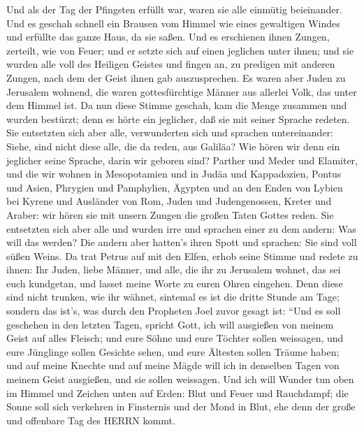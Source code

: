  Und als der Tag der Pfingsten erfüllt war, waren sie alle
einmütig beieinander.  Und es geschah schnell ein Brausen
vom Himmel wie eines gewaltigen Windes und erfüllte das ganze Haus, da
sie saßen.  Und es erschienen ihnen Zungen, zerteilt, wie
von Feuer; und er setzte sich auf einen jeglichen unter ihnen;
 und sie wurden alle voll des Heiligen Geistes und fingen
an, zu predigen mit anderen Zungen, nach dem der Geist ihnen gab
auszusprechen.  Es waren aber Juden zu Jerusalem wohnend,
die waren gottesfürchtige Männer aus allerlei Volk, das unter dem Himmel
ist.  Da nun diese Stimme geschah, kam die Menge zusammen
und wurden bestürzt; denn es hörte ein jeglicher, daß sie mit seiner
Sprache redeten.  Sie entsetzten sich aber alle,
verwunderten sich und sprachen untereinander: Siehe, sind nicht diese
alle, die da reden, aus Galiläa?  Wie hören wir denn ein
jeglicher seine Sprache, darin wir geboren sind?  Parther
und Meder und Elamiter, und die wir wohnen in Mesopotamien und in Judäa
und Kappadozien, Pontus und Asien,  Phrygien und
Pamphylien, Ägypten und an den Enden von Lybien bei Kyrene und Ausländer
von Rom,  Juden und Judengenossen, Kreter und Araber: wir
hören sie mit unsern Zungen die großen Taten Gottes reden. 
Sie entsetzten sich aber alle und wurden irre und sprachen einer zu dem
andern: Was will das werden?  Die andern aber hatten's
ihren Spott und sprachen: Sie sind voll süßen Weins.  Da
trat Petrus auf mit den Elfen, erhob seine Stimme und redete zu ihnen:
Ihr Juden, liebe Männer, und alle, die ihr zu Jerusalem wohnet, das sei
euch kundgetan, und lasset meine Worte zu euren Ohren eingehen.
 Denn diese sind nicht trunken, wie ihr wähnet, sintemal es
ist die dritte Stunde am Tage;  sondern das ist's, was
durch den Propheten Joel zuvor gesagt ist:  ``Und es soll
geschehen in den letzten Tagen, spricht Gott, ich will ausgießen von
meinem Geist auf alles Fleisch; und eure Söhne und eure Töchter sollen
weissagen, und eure Jünglinge sollen Gesichte sehen, und eure Ältesten
sollen Träume haben;  und auf meine Knechte und auf meine
Mägde will ich in denselben Tagen von meinem Geist ausgießen, und sie
sollen weissagen.  Und ich will Wunder tun oben im Himmel
und Zeichen unten auf Erden: Blut und Feuer und Rauchdampf;
 die Sonne soll sich verkehren in Finsternis und der Mond
in Blut, ehe denn der große und offenbare Tag des HERRN kommt.
